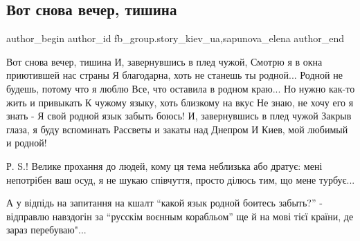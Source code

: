  
 
 
 
 
 
\subsection{Вот снова вечер, тишина}
\label{sec:16_04_2022.fb.fb_group.story_kiev_ua.1.vecher_tishina}
 
\ifcmt
 author_begin
   author_id fb_group.story_kiev_ua,sapunova_elena
 author_end
\fi

\raggedcolumns
\begin{multicols}{2} %
\setlength{\parindent}{0pt}

\Large
\obeycr
Вот снова вечер, тишина
И, завернувшись в плед чужой,
Смотрю я в окна приютившей нас страны
Я благодарна, хоть не станешь ты родной...
\smallskip
Родной не будешь, потому что я люблю
Все, что оставила в родном краю...
Но нужно как-то жить и привыкать
К чужому языку, хоть близкому на вкус
\smallskip
Не знаю, не хочу его я знать -
Я свой родной язык забыть боюсь! 
И,  завернувшись в плед чужой
\smallskip
Закрыв глаза, я буду вспоминать
Рассветы и закаты над Днепром
И Киев, мой любимый и родной!
\restorecr
\end{multicols} %

Р. S.! Велике прохання до людей, кому ця тема неблизька або дратує: мені
непотрібен ваш осуд, я не шукаю співчуття, просто ділюсь тим, що мене турбує...

А у відпідь на запитання на кшалт \enquote{какой язык родной боитесь забыть?} -
відправлю навздогін за \enquote{русскім воєнным корабльом} ще й на мові тієї країни,
де зараз перебуваю"...

\raggedcolumns
\begin{multicols}{3} %
\setlength{\parindent}{0pt}


\end{multicols} %

